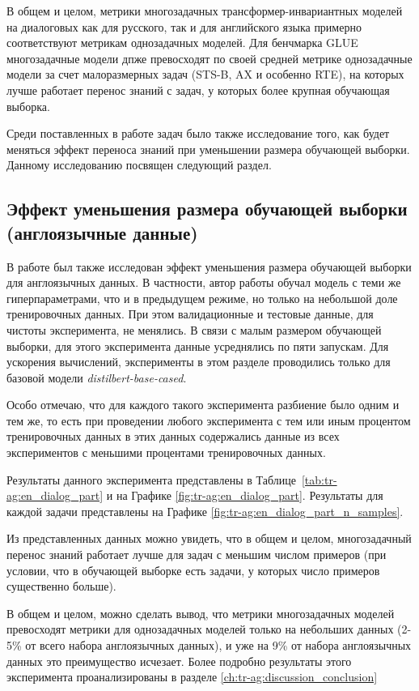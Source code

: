 В общем и целом, метрики многозадачных трансформер-инвариантных моделей на диалоговых как для русского, так и для английского языка примерно соответствуют метрикам однозадачных моделей.
 Для бенчмарка GLUE многозадачные модели дпже превосходят по своей средней метрике однозадачные модели за счет малоразмерных задач (STS-B, AX и особенно RTE), на которых лучше работает перенос знаний с задач, у которых более крупная обучающая выборка. 

Среди поставленных в работе задач было также исследование того, как будет меняться эффект переноса знаний при уменьшении размера обучающей выборки. Данному исследованию посвящен следующий раздел. 

\subsection{Эффект уменьшения размера обучающей выборки (англоязычные данные)}
В работе был также исследован эффект уменьшения размера обучающей выборки для англоязычных данных. В частности, автор работы обучал модель с теми же гиперпараметрами, что и в предыдущем режиме, но только на небольшой доле тренировочных данных. При этом валидационные и тестовые данные, для чистоты эксперимента, не менялись. В связи с малым размером обучающей выборки, для этого эксперимента данные усреднялись по пяти запускам. Для ускорения вычислений, эксперименты в этом разделе проводились только для базовой модели \textit{distilbert-base-cased}. 

Особо отмечаю, что для каждого такого эксперимента разбиение было одним и тем же, то есть при проведении любого эксперимента с тем или иным процентом тренировочных данных в этих данных содержались данные из всех экспериментов с меньшими процентами тренировочных данных. 

Результаты данного эксперимента представлены в Таблице~\ref{tab:tr-ag:en_dialog_part} и на Графике \ref{fig:tr-ag:en_dialog_part}. Результаты для каждой задачи представлены на Графике  \ref{fig:tr-ag:en_dialog_part_n_samples}. %

Из представленных данных можно увидеть, что в общем и целом, многозадачный перенос знаний работает лучше для задач с меньшим числом примеров (при условии, что в обучающей выборке есть задачи, у которых число примеров существенно больше). 

В общем и целом, можно сделать вывод, что метрики многозадачных моделей превосходят метрики для однозадачных моделей только на небольших данных (2-5\% от всего набора англоязычных данных), и уже на 9\% от набора англоязычных данных это преимущество исчезает. Более подробно результаты этого эксперимента проанализированы в разделе \ref{ch:tr-ag:discussion_conclusion}

